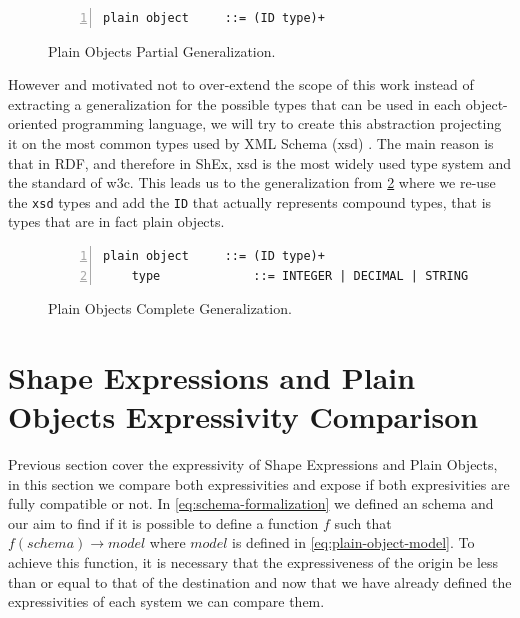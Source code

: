\begin{figure}
    \begin{lstlisting}[numbers=left,basicstyle=\ttfamily\small]
    plain object     ::= (ID type)+
    \end{lstlisting}
    \caption[Plain Objects Partial Generalization]{Plain Objects Partial Generalization.}
    \label{fig:po-generalization}
\end{figure}

However and motivated not to over-extend the scope of this work instead of extracting a generalization for the possible types
that can be used in each object-oriented programming language, we will try to create this abstraction projecting it on the
most common types used by XML Schema (xsd) \cite{xmlschemasimpleelements}. The main reason is that in RDF, and therefore in ShEx, xsd is the most widely
used type system and the standard of w3c. This leads us to the generalization from \cref{fig:po-generalization-complete} where we re-use the
\texttt{xsd} types and add the \texttt{ID} that actually represents compound types, that is types that are in fact plain objects.

\begin{figure}
    \begin{lstlisting}[numbers=left,basicstyle=\ttfamily\small]
    plain object     ::= (ID type)+
    type             ::= INTEGER | DECIMAL | STRING | BOOLEAN | ID
    \end{lstlisting}
    \caption[Plain Objects Complete Generalization]{Plain Objects Complete Generalization.}
    \label{fig:po-generalization-complete}
\end{figure}


\section{Shape Expressions and Plain Objects Expressivity Comparison}

Previous section cover the expressivity of Shape Expressions and Plain Objects, in this section we compare both expressivities and
expose if both expresivities are fully compatible or not. In \cref{eq:schema-formalization} we defined an schema and our aim to find if it is possible
to define a function $f$ such that $f(schema)\rightarrow model$ where $model$ is defined in \cref{eq:plain-object-model}. To achieve this function, it
is necessary that the expressiveness of the origin be less than or equal to that of the destination and now that we have already defined the
expressivities of each system we can compare them.

